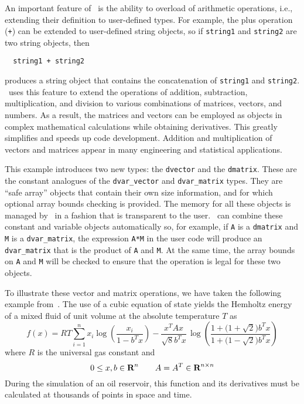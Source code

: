 \documentclass{admbmanual}
\begin{document}
An important feature of \cplus\ is the ability to overload of arithmetic
operations, i.e., extending their definition to user-defined types. For example,
the plus operation (\texttt{+}) can be extended to user-defined string objects,
so if \texttt{string1} and \texttt{string2} are two string objects, then
\begin{lstlisting}
  string1 + string2
\end{lstlisting}
produces a string object that contains the concatenation of \texttt{string1} and
\texttt{string2}. \scAD\ uses this feature to extend the operations of addition,
subtraction, multiplication, and division to various combinations of matrices,
vectors, and numbers. As a result, the matrices and vectors can be employed as
objects in complex mathematical calculations while obtaining derivatives. This
greatly simplifies and speeds up code development. Addition and multiplication
of vectors and matrices appear in many engineering and statistical applications.


This example introduces two new types: the \texttt{dvector} and the
\texttt{dmatrix}. These are the constant analogues of the \texttt{dvar\_vector}
and \texttt{dvar\_matrix} types. They are ``safe array'' objects that contain
their own size information, and for which optional array bounds checking is
provided. The memory for all these objects is managed by \scAD\ in a fashion
that is transparent to the user. \scAD\ can combine these constant and variable
objects automatically so, for example, if \texttt{A} is a \texttt{dmatrix} and
\texttt{M} is a \texttt{dvar\_matrix}, the expression \texttt{A*M} in the user
code will produce an \texttt{dvar\_matrix} that is the product of \texttt{A} and
\texttt{M}. At the same time, the array bounds on \texttt{A} and \texttt{M} will
be checked to ensure that the operation is legal for these two objects.

To illustrate these vector and matrix operations, we have taken the following
example from~\cite{griewank1988}. The use of a cubic equation of state yields
the Hemholtz energy of a mixed fluid of unit volume at the absolute temperature
$T$ as
\begin{equation*}
  f(x)=RT\sum_{i=1}^n x_i \log\left(\frac{x_i}{1-b^Tx}\right)
-\frac{x^TAx}{\sqrt{8}b^Tx}
   \,\log\left(%
       \frac{1+\big(1+\sqrt{2}\big)b^Tx}%
               {1+\big(1-\sqrt{2}\big)b^Tx}\right)
\end{equation*}
where $R$ is the universal gas constant and
\begin{equation*}
  0\le x,b \in {\mbox{\bf R}}^n\qquad
                      A=A^T\in {\mbox{\bf R}}^{n\times n}
\end{equation*}
During the simulation of an oil reservoir, this function and its derivatives
must be calculated at thousands of points in space and time.
\end{document}
